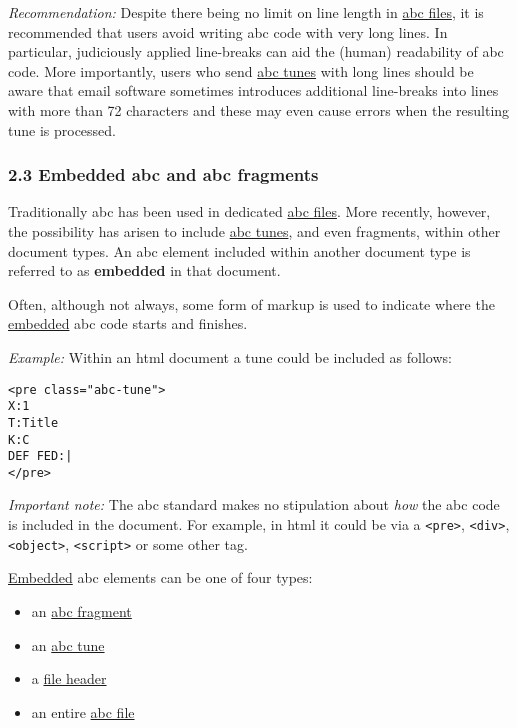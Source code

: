 \emph{Recommendation:} Despite there being no limit on line length in
\protect\hyperlink{abc_file_definition}{abc files}, it is recommended
that users avoid writing abc code with very long lines. In particular,
judiciously applied line-breaks can aid the (human) readability of abc
code. More importantly, users who send
\protect\hyperlink{abc_tune_definition}{abc tunes} with long lines
should be aware that email software sometimes introduces additional
line-breaks into lines with more than 72 characters and these may even
cause errors when the resulting tune is processed.

\hypertarget{embedded_abc_and_abc_fragments}{\subsubsection{2.3 Embedded
abc and abc fragments}\label{embedded_abc_and_abc_fragments}}

\href{}{}Traditionally abc has been used in dedicated
\protect\hyperlink{abc_file_definition}{abc files}. More recently,
however, the possibility has arisen to include
\protect\hyperlink{abc_tune_definition}{abc tunes}, and even fragments,
within other document types. An abc element included within another
document type is referred to as \textbf{embedded} in that document.

Often, although not always, some form of markup is used to indicate
where the \protect\hyperlink{embedded_definition}{embedded} abc code
starts and finishes.

\emph{Example:} Within an html document a tune could be included as
follows:

\begin{verbatim}
<pre class="abc-tune">
X:1
T:Title
K:C
DEF FED:|
</pre>
\end{verbatim}

\emph{Important note:} The abc standard makes no stipulation about
\emph{how} the abc code is included in the document. For example, in
html it could be via a \texttt{\textless{}pre\textgreater{}},
\texttt{\textless{}div\textgreater{}},
\texttt{\textless{}object\textgreater{}},
\texttt{\textless{}script\textgreater{}} or some other tag.

\protect\hyperlink{embedded_definition}{Embedded} abc elements can be
one of four types:

\begin{itemize}
\item
  an \protect\hyperlink{abc_fragment_definition}{abc fragment}
\item
  an \protect\hyperlink{abc_tune_definition}{abc tune}
\item
  a \protect\hyperlink{file_header_definition}{file header}
\item
  an entire \protect\hyperlink{abc_file_definition}{abc file}
\end{itemize}

